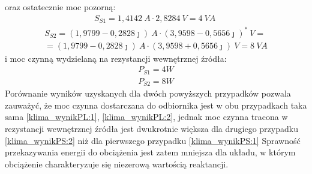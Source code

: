 \begin{task}
oraz ostatecznie moc pozorną:
\begin{align}
S_{S1} = 1,4142 \: A\cdot  2,8284 \: V = 4  \:VA \;
\end{align}
\begin{multline}
S_{S2} =  (1,9799 - 0,2828 \jmath) \: A\cdot (3,9598 - 0,5656 \jmath)^* \: V = \\=(1,9799 - 0,2828 \jmath) \: A\cdot (3,9598 + 0,5656 \jmath) \: V = 8 \: VA
\end{multline}
i moc czynną wydzielaną na rezystancji wewnętrznej źródła:
\begin{align}
\label{klima_wynikPS:1}
P_{S1} = 4 W\\
\label{klima_wynikPS:2}
P_{S2} = 8 W
\end{align}
Porównanie wyników uzyskanych dla dwóch powyższych przypadków pozwala zauważyć, że moc czynna dostarczana do odbiornika jest w obu przypadkach taka sama \eqref{klima_wynikPL:1}, \eqref{klima_wynikPL:2}, jednak moc czynna tracona w rezystancji wewnętrznej źródła jest dwukrotnie większa dla drugiego przypadku \eqref{klima_wynikPS:2} niż dla pierwszego przypadku \eqref{klima_wynikPS:1} Sprawność przekazywania energii do obciążenia jest zatem mniejsza dla układu, w którym obciążenie charakteryzuje się niezerową wartością reaktancji.
\end{task}